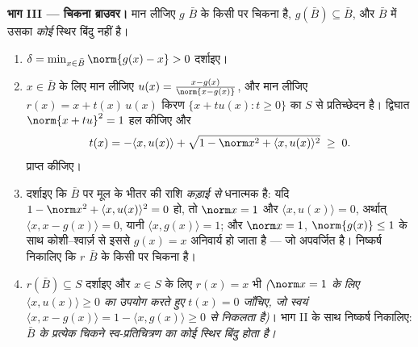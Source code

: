 \begin{problem}[{सप्ताहांत समस्या --- कोई प्रत्याकर्षण नहीं, कोई
पलायन नहीं}]
\medskip
\noindent\textbf{भाग III --- चिकना ब्राउवर।} मान लीजिए $g$
$\bar B$ के किसी  पर चिकना है, $g(\bar B)
\subseteq \bar B$, और $\bar B$ में उसका
\emph{कोई} स्थिर बिंदु नहीं है।
\begin{enumerate}[resume]
  \item $\delta = \min_{x\in\bar B}\norm{g(x) - x} >
        0$ दर्शाइए।
  \item $x \in \bar B$ के लिए मान लीजिए $u(x) = \frac{x -
        g(x)}{\norm{x - g(x)}}$, और मान लीजिए $r(x) = x +
        t(x)\,u(x)$ किरण
        $\{x + tu(x) : t \geq 0\}$ का $S$ से प्रतिच्छेदन है। द्विघात $\norm{x + tu}^2 = 1$ हल कीजिए
        और
        \[
        t(x) = -\langle x, u(x)\rangle +
        \sqrt{1 - \norm x^2 + \langle x, u(x)\rangle^2}
        \;\geq\; 0 .
        \]
        प्राप्त कीजिए।
  \item दर्शाइए कि $\bar B$ पर मूल के भीतर की राशि \emph{कड़ाई से}
        धनात्मक है: यदि $1 - \norm x^2 + \langle x,
        u(x)\rangle^2 = 0$ हो, तो $\norm x = 1$ और $\langle
        x, u(x)\rangle = 0$, अर्थात्
        $\langle x, x -
        g(x)\rangle = 0$, यानी $\langle x, g(x)\rangle =
        1$; और $\norm x = 1$, $\norm{g(x)} \leq 1$ के साथ कोशी--श्वार्ज़
        से इससे $g(x) = x$ अनिवार्य हो जाता है --- जो अपवर्जित है।
        निष्कर्ष निकालिए कि $r$ $\bar B$ के किसी  पर चिकना
        है।
  \item $r(\bar B) \subseteq S$ दर्शाइए और $x
        \in S$ के लिए $r(x) = x$ भी \emph{($\norm x = 1$ के
        लिए $\langle x, u(x)\rangle \geq 0$ का उपयोग करते हुए $t(x) = 0$ जाँचिए, जो स्वयं $\langle x, x - g(x)\rangle = 1 -
        \langle x, g(x)\rangle \geq 0$
        से निकलता है)}। भाग II के साथ निष्कर्ष निकालिए:
        \emph{$\bar B$ के प्रत्येक चिकने स्व-प्रतिचित्रण का कोई
        स्थिर बिंदु होता है।}
\end{enumerate}


\end{problem}
